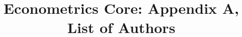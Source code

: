 \documentclass{tex/tufte-handout}
\title{Econometrics Core: Appendix A, List of Authors}
\begin{document}
\maketitle
\bigskip

\end{document}
